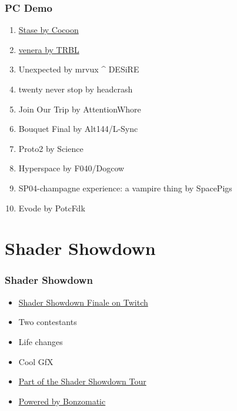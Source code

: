 \documentclass{beamer}
\begin{document}
\begin{frame}
  \frametitle{PC Demo}
  \begin{enumerate}
  \item \href{https://www.pouet.net/prod.php?which=77686}{Stase by Cocoon}
  \item \href{https://www.pouet.net/prod.php?which=77671}{venera by TRBL}
  \item Unexpected by mrvux \^{} DESiRE
  \item twenty never stop by headcrash
  \item Join Our Trip by AttentionWhore
  \item Bouquet Final by Alt144/L-Sync
  \item Proto2 by Science
  \item Hyperspace by F040/Dogcow
  \item SP04-champagne experience: a vampire thing by SpacePigs
  \item Evode by PotcFdk
  \end{enumerate}
\end{frame}


\section{Shader Showdown}

\begin{frame}
\frametitle{Shader Showdown}
\begin{itemize}
\item \href{https://www.twitch.tv/videos/298540965?t=01h58m47s}{Shader Showdown Finale on Twitch}
\item Two contestants
\item Life changes
\item Cool GfX
\item \href{https://www.facebook.com/shadershowdown/}{Part of the Shader Showdown Tour}
\item \href{https://github.com/Gargaj/Bonzomatic}{Powered by Bonzomatic}
\end{itemize}
\end{frame}
\end{document}
